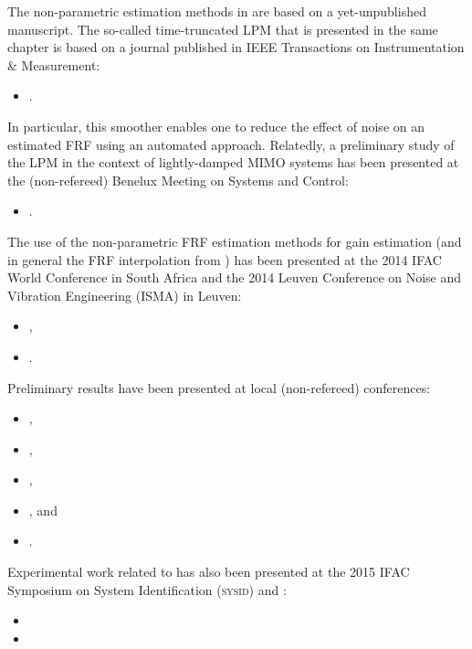 \begin{refsection}
The non-parametric estimation methods in  are based on a yet-unpublished manuscript.
 The so-called time-truncated \gls{LPM} that is presented in the same chapter is based on a journal published in \gls{IEEE} Transactions on Instrumentation \& Measurement:
\begin{itemize}
  \item {}.
\end{itemize}
In particular, this smoother enables one to reduce the effect of noise on an estimated \gls{FRF} using an automated approach.
Relatedly, a preliminary study of the \gls{LPM} in the context of lightly-damped \gls{MIMO} systems has been presented at the (non-refereed) Benelux Meeting on Systems and Control:
\begin{itemize}
    \item {}.
\end{itemize}

The use of the non-parametric \gls{FRF} estimation methods for \Hinf gain estimation (and in general the \gls{FRF} interpolation from ) has been presented at the 2014 \gls{IFAC} World Conference in South Africa and the 2014 Leuven Conference on Noise and Vibration Engineering (ISMA) in Leuven:
\begin{itemize}
  \item {},
  \item {}.
\end{itemize}
Preliminary results have been presented at local (non-refereed) conferences:
\begin{itemize}
  \item {},
  \item {},
  \item {},
  \item {}, and
  \item {}.
\end{itemize}
Experimental work related to  has also been presented at the 2015 \gls{IFAC} Symposium on System Identification (\textsc{sysid}) and :
\begin{itemize}
  \item {}
  \item {}
\end{itemize}


\end{refsection}
